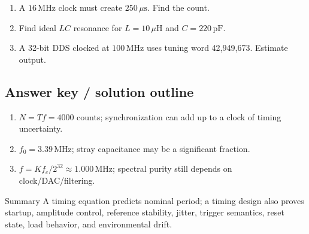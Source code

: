 \documentclass[10pt,letterpaper]{article}
\begin{document}
\begin{enumerate}
  \item A $16\,\mathrm{MHz}$ clock must create $250\,\mu\mathrm{s}$. Find the count.
  \item Find ideal $LC$ resonance for $L=10\,\mu\mathrm{H}$ and $C=220\,\mathrm{pF}$.
  \item A 32-bit DDS clocked at $100\,\mathrm{MHz}$ uses tuning word 42,949,673. Estimate output.
\end{enumerate}\subsection{Answer key / solution outline}
\begin{enumerate}
  \item $N=Tf=4000$ counts; synchronization can add up to a clock of timing uncertainty.
  \item $f_0=3.39\,\mathrm{MHz}$; stray capacitance may be a significant fraction.
  \item $f=Kf_c/2^{32}\approx1.000\,\mathrm{MHz}$; spectral purity still depends on clock/DAC/filtering.
\end{enumerate}\begin{CornellSummaryBox}{Summary}
A timing equation predicts nominal period; a timing design also proves startup, amplitude control, reference stability, jitter, trigger semantics, reset state, load behavior, and environmental drift.
\end{CornellSummaryBox}
\end{document}
